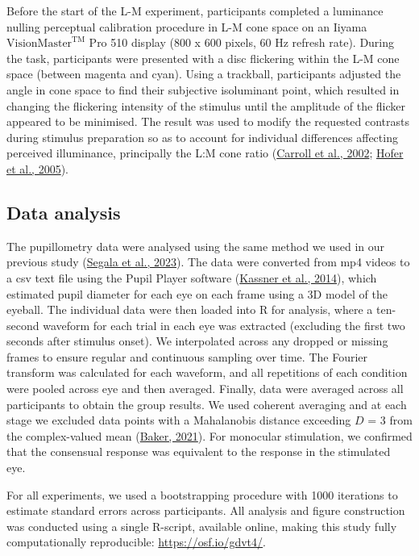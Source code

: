 \documentclass[
]{article}
\begin{document}
Before the start of the L-M experiment, participants completed a luminance nulling perceptual calibration procedure in L-M cone space on an Iiyama \(\textrm{VisionMaster}^{\textrm{TM}}\) Pro 510 display (800 x 600 pixels, 60 Hz refresh rate). During the task, participants were presented with a disc flickering within the L-M cone space (between magenta and cyan). Using a trackball, participants adjusted the angle in cone space to find their subjective isoluminant point, which resulted in changing the flickering intensity of the stimulus until the amplitude of the flicker appeared to be minimised. The result was used to modify the requested contrasts during stimulus preparation so as to account for individual differences affecting perceived illuminance, principally the L:M cone ratio (\protect\hyperlink{ref-Carroll2002}{Carroll et al., 2002}; \protect\hyperlink{ref-Hofer2005}{Hofer et al., 2005}).

\hypertarget{data-analysis}{%
\subsection{Data analysis}\label{data-analysis}}

The pupillometry data were analysed using the same method we used in our previous study (\protect\hyperlink{ref-Segala2023}{Segala et al., 2023}). The data were converted from mp4 videos to a csv text file using the Pupil Player software (\protect\hyperlink{ref-Kassner2014}{Kassner et al., 2014}), which estimated pupil diameter for each eye on each frame using a 3D model of the eyeball. The individual data were then loaded into R for analysis, where a ten-second waveform for each trial in each eye was extracted (excluding the first two seconds after stimulus onset). We interpolated across any dropped or missing frames to ensure regular and continuous sampling over time. The Fourier transform was calculated for each waveform, and all repetitions of each condition were pooled across eye and then averaged. Finally, data were averaged across all participants to obtain the group results. We used coherent averaging and at each stage we excluded data points with a Mahalanobis distance exceeding \(D\) = 3 from the complex-valued mean (\protect\hyperlink{ref-Baker2021}{Baker, 2021}). For monocular stimulation, we confirmed that the consensual response was equivalent to the response in the stimulated eye.

For all experiments, we used a bootstrapping procedure with 1000 iterations to estimate standard errors across participants. All analysis and figure construction was conducted using a single R-script, available online, making this study fully computationally reproducible: \url{https://osf.io/gdvt4/}.
\end{document}

